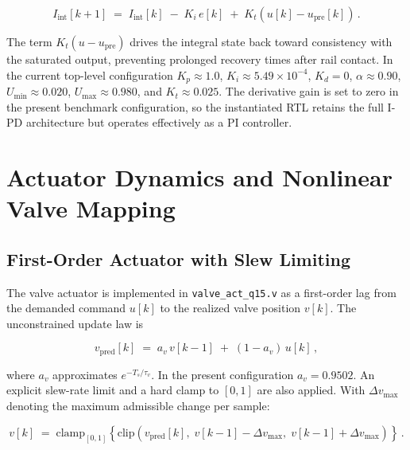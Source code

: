 \begin{equation}
  I_{\mathrm{int}}[k+1] \;=\; I_{\mathrm{int}}[k]
    \;-\; K_i\,e[k]
    \;+\; K_t\left(u[k] - u_{\mathrm{pre}}[k]\right) \,.
  \label{eq:antiwindup}
\end{equation}

The term $K_t(u - u_{\mathrm{pre}})$ drives the integral state back
toward consistency with the saturated output, preventing prolonged
recovery times after rail contact.  In the current top-level
configuration $K_p \approx 1.0$, $K_i \approx 5.49\times10^{-4}$,
$K_d = 0$, $\alpha \approx 0.90$, $U_{\min} \approx 0.020$,
$U_{\max} \approx 0.980$, and $K_t \approx 0.025$.  The derivative gain
is set to zero in the present benchmark configuration, so the
instantiated RTL retains the full I-PD architecture but operates
effectively as a PI controller.

\section{Actuator Dynamics and Nonlinear Valve Mapping}
\label{sec:bench_actuator}

\subsection{First-Order Actuator with Slew Limiting}
\label{ssec:bench_act_fo}

The valve actuator is implemented in \texttt{valve\_act\_q15.v} as a
first-order lag from the demanded command $u[k]$ to the realized valve
position $v[k]$.  The unconstrained update law is

\begin{equation}
  v_{\mathrm{pred}}[k] \;=\; a_v\,v[k-1] \;+\; (1-a_v)\,u[k] \,,
  \label{eq:valve_fo}
\end{equation}

where $a_v$ approximates $e^{-T_s/\tau_v}$.  In the present
configuration $a_v = 0.9502$.  An explicit slew-rate limit and a hard
clamp to $[0,1]$ are also applied.  With $\Delta v_{\max}$ denoting the
maximum admissible change per sample:

\begin{equation}
  v[k] \;=\; \mathrm{clamp}_{[0,1]}\!\left\{
    \mathrm{clip}\left(v_{\mathrm{pred}}[k],\;
    v[k-1]-\Delta v_{\max},\; v[k-1]+\Delta v_{\max}\right)
  \right\} \,.
  \label{eq:valve_slew}
\end{equation}

